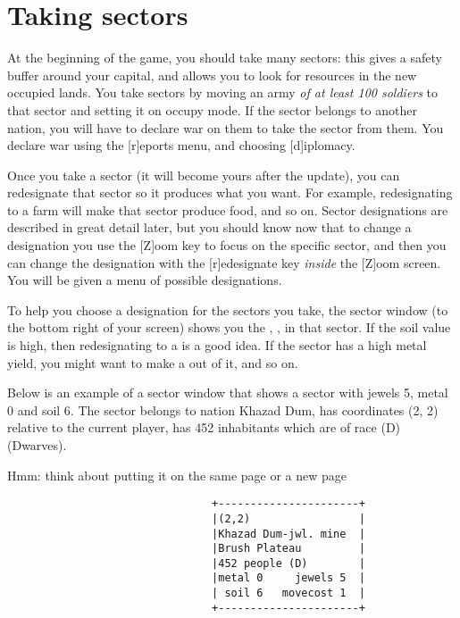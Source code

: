 \section{Taking sectors}
At the beginning of the game, you should take many sectors: this gives
a safety buffer around your capital, and allows you to look for
resources in the new occupied lands.  You take sectors by moving an
army \emph{of at least 100 soldiers} to that sector and setting it on
occupy mode.  If the sector belongs to another nation, you will have
to declare war on them to take the sector from them.  You declare war
using the [r]eports menu, and choosing [d]iplomacy.

Once you take a sector (it will become yours after the update), you
can redesignate that sector so it produces what you want.  For
example, redesignating to a farm will make that sector produce food,
and so on.  Sector designations are described in great detail later,
but you should know now that to change a designation you use the
[Z]oom key to focus on the specific sector, and then you can change
the designation with the [r]edesignate key \emph{inside} the [Z]oom
screen.  You will be given a menu of possible designations.

To help you choose a designation for the sectors you take, the sector
window (to the bottom right of your screen) shows you the ,
,  in that sector.  If the soil value is
high, then redesignating to a  is a good idea.  If the
sector has a high metal yield, you might want to make a 
out of it, and so on.

Below is an example of a sector window that shows a sector with jewels
5, metal 0 and soil 6.  The sector belongs to nation Khazad Dum, has
coordinates (2, 2) relative to the current player, has 452 inhabitants
which are of race (D) (Dwarves).

\comment Hmm:  think about putting it on the same page or a new page
\comment \newpage
\begin{verbatim}
                                +----------------------+
                                |(2,2)                 |
                                |Khazad Dum-jwl. mine  |
                                |Brush Plateau         |
                                |452 people (D)        |
                                |metal 0     jewels 5  |
                                | soil 6   movecost 1  |
                                +----------------------+
\end{verbatim}

